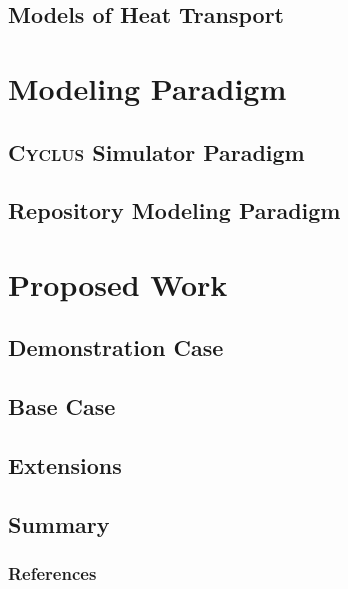 \documentclass[9pt]{beamer}
\begin{document}
\subsection{Models of Heat Transport}

\section{Modeling Paradigm}
\subsection{\textsc{Cyclus} Simulator Paradigm}

\subsection{Repository Modeling Paradigm}

\section{Proposed Work}
\subsection{Demonstration Case}

\subsection{Base Case}

\subsection{Extensions}

\subsection{Summary}



\begin{frame}[allowframebreaks]
  \frametitle{References}
  
  {\footnotesize }
\end{frame}
\end{document}

